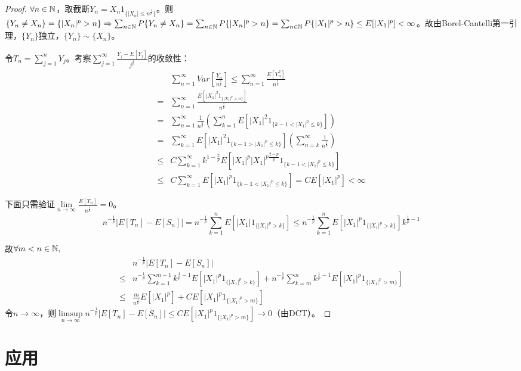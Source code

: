 \documentclass{ctexart}
\begin{document}
\begin{proof}
  $\forall n\in\mathbb{N}$，取截断$Y_{n}=X_{n}1_{\{|X_{n}|\leq n^{\frac 1 p}\}}$。则$\{Y_{n}\neq X_{n}\}=\{|X_{n}|^{p}>n\}\Rightarrow \sum_{n\in\mathbb{N}} P\{Y_{n}\neq X_{n}\}=\sum_{n\in\mathbb{N}} P\{|X_{n}|^{p}>n\}=\sum_{n\in\mathbb{N}} P\{|X_{1}|^{p}>n\}\leq E[|X_{1}|^{p}]<\infty$。故由Borel-Cantelli第一引理，$\{Y_{n}\}$独立，$\{Y_{n}\}\sim \{X_{n}\}$。

  令$T_{n}=\sum_{j=1}^{n}Y_{j}$。考察$\sum_{j=1}^{\infty}\frac{Y_{j}-E[Y_{j}]}{j^{\frac 1 p}}$的收敛性：
  \begin{align*}
    &\sum_{n=1}^{\infty}Var[\frac{Y_{n}}{n^{\frac 1 p}}]\leq \sum_{n=1}^{\infty}\frac{E[Y_{n}^{2}]}{n^{\frac 2 p}}\\
    =&\sum_{n=1}^{\infty}\frac{E[|X_{1}|^{2}1_{\{|X_{1}|^{p}>n\}}]}{n^{\frac 2 p}}\\
    =&\sum_{n=1}^{\infty}\frac{1}{n^{\frac 2 p}}(\sum_{k=1}^{n}E[|X_{1}|^{2}1_{\{k-1<|X_{1}|^{p}\leq k\}}])\\
    =&\sum_{k=1}^{\infty}E[|X_{1}|^{2}1_{\{k-1>|X_{1}|^{p}\leq k\}}](\sum_{n=k}^{\infty}\frac{1}{n^{\frac 2 p}})\\
    \leq& C\sum_{k=1}^{\infty}k^{1-\frac{2}{p}}E[|X_{1}|^{p}|X_{1}|^{p\frac{2-p}{p}}1_{\{k-1<|X_{1}|^{p}\leq k\}}]\\
    \leq& C\sum_{k=1}^{\infty}E[|X_{1}|^{p}1_{\{k-1<|X_{1}|^p\leq k\}}]=CE[|X_{1}|^{p}]<\infty
  \end{align*}

  下面只需验证$\lim\limits_{n\to\infty}\frac{E[T_{n}]}{n^{\frac 1 p}}= 0$。
  \[n^{-\frac 1 p}|E[T_{n}]-E[S_{n}]|=n^{-\frac 1 p}\sum_{k=1}^{n}E[|X_{1}|1_{\{|X_{1}|^{p}>k\}}]\leq n^{-\frac 1 p}\sum_{k=1}^{n}E[|X_{1}|^{p}1_{\{|X_{1}|^{p}>k\}}]k^{\frac{1}{p}-1}\]

  故$\forall m<n\in\mathbb{N}, $
  \begin{align*}
    &n^{-\frac 1 p}|E[T_{n}]-E[S_{n}]|\\
    \leq& n^{-\frac 1 p}\sum_{k=1}^{m-1}k^{\frac{1}{p}-1}E[|X_{1}|^{p}1_{\{|X_{1}|^{p}>k\}}]+n^{-\frac 1 p}\sum_{k=m}^{n}k^{\frac{1}{p}-1}E[|X_{1}|^{p}1_{\{|X_{1}|^{p}>m\}}]\\
    \leq& \frac{m}{n^{\frac{1}{p}}}E[|X_{1}|^{p}]+CE[|X_{1}|^{p}1_{\{|X_{1}|^{p}>m\}}]
  \end{align*}
  令$n\to\infty$，则$\limsup\limits_{n\to\infty} n^{-\frac 1 p}|E[T_{n}]-E[S_{n}]|\leq CE[|X_{1}|^{p}1_{\{|X_{1}|^{p}>m\}}]\to 0$（由DCT）。
\end{proof}

\section{应用}
\end{document}
